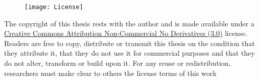 \newpage \vspace*{8cm}
%

\thispagestyle{empty}

\begin{center}

\begin{figure}[ht]
    \centering
    \texttt{[image: License]}
\end{figure}

   The copyright of this thesis rests with the author and is made available under a \href{https://creativecommons.org/licenses/by-nc-nd/3.0/}{Creative Commons Attribution Non-Commercial No Derivatives (3.0)} license. Readers are free to copy, distribute or transmit this thesis on the condition that they attribute it, that they do not use it for commercial purposes and that they do not alter, transform or build upon it. For any reuse or redistribution, researchers must make clear to others the license terms of this work
\end{center}